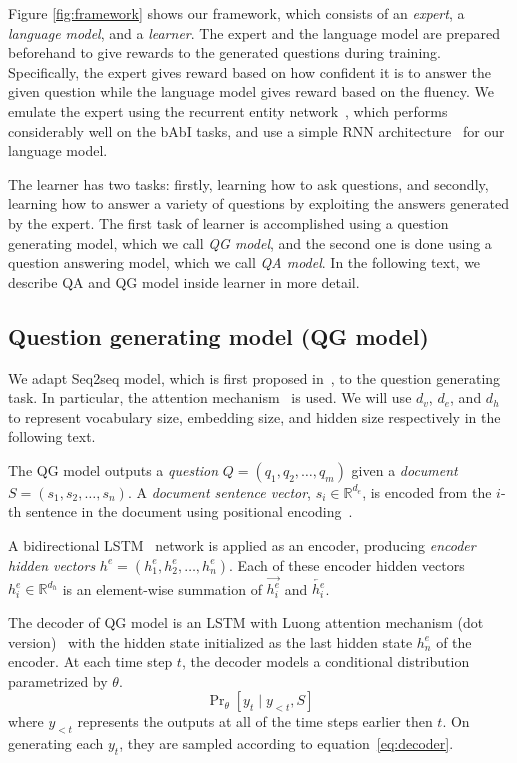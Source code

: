 \documentclass{article}
\begin{document}
Figure \ref{fig:framework} shows our framework, which consists of an \emph{expert}, a \emph{language model}, and a \emph{learner}. The expert and the language model are prepared beforehand to give rewards to the generated questions during training. Specifically, the expert gives reward based on how confident it is to answer the given question while the language model gives reward based on the fluency. We emulate the expert using the recurrent entity network~\cite{hwsbl16:entnet}, which performs considerably well on the bAbI tasks, and use a simple RNN architecture~\cite{zsv14:language_model} for our language model.

The learner has two tasks: firstly, learning how to ask questions, and secondly, learning how to answer a variety of questions by exploiting the answers generated by the expert. The first task of learner is accomplished using a question generating model, which we call \emph{QG model}, and the second one is done using a question answering model, which we call \emph{QA model}. In the following text, we describe QA and QG model inside learner in more detail.

\subsection{Question generating model (QG model)}
We adapt Seq2seq model, which is first proposed in~\cite{cmgbsb14:seq2seq}, to the question generating task. In particular, the attention mechanism~\cite{bcb14:attention1, vkkpsh14:attention2, lpm15:Luong} is used. We will use $d_v$, $d_e$, and $d_h$ to represent vocabulary size, embedding size, and hidden size respectively in the following text.

The QG model outputs a \emph{question} $Q = (q_1, q_2, \ldots, q_m)$ given a \emph{document} $S = (s_1, s_2, \ldots, s_n)$. A \emph{document sentence vector}, $s_i \in \mathbb{R}^{d_e}$, is encoded from the $i$-th sentence in the document using positional encoding~\cite{sswf15:memn2n}.

A bidirectional LSTM~\cite{hs97:lstm} network is applied as an encoder, producing \emph{encoder hidden vectors} $h^e = (h^e_1, h^e_2, \ldots, h^e_n)$. Each of these encoder hidden vectors $h^e_i \in \mathbb{R}^{d_h}$ is an element-wise summation of $\overrightarrow{h^e_i}$ and $\overleftarrow{h^e_i}$.

The decoder of QG model is an LSTM with Luong attention mechanism (dot version)~\cite{lpm15:Luong} with the hidden state initialized as the last hidden state $h^e_n$ of the encoder. At each time step $t$, the decoder models a conditional distribution parametrized by $\theta$.
\begin{equation}
    \label{eq:decoder}
    \Pr\nolimits_{\theta}\left[y_t \mid y_{<t}, S\right]
\end{equation}
where $y_{<t}$ represents the outputs at all of the time steps earlier then $t$. On generating each $y_t$, they are sampled according to equation~\ref{eq:decoder}.
\end{document}
